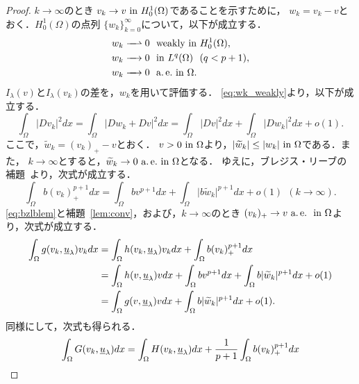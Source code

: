\begin{proof}
 $k \to \infty$のとき
 $v_k \to v ~\tin H_0^1(\Omega)$であることを示すために，
 $w_k = v_k - v$とおく．$H_0^1(\Omega)$の点列
 $\{ w_k \}_{k=0}^\infty$について，以下が成立する．
 \begin{align}
  w_k \xrightharpoonup{ \mbox{ ~ } } 0 & \ \ \text{weakly~} \tin
  H_0^1(\Omega), \label{eq:wk_weakly} \\
  w_k \xrightarrow{ \mbox{ ~ } } 0 & \ \ \tin L^q(\Omega) \ \
  (q < p+1), \label{eq:wk_Lq} \\
  w_k \xrightarrow{ \mbox{ ~ } } 0 & \ \ \ae \tin \Omega. 
  \label{eq:wk_ae}
 \end{align}
 $I_\lambda(v)$と$I_\lambda(v_k)$の差を，$w_k$を用いて評価する．
 \eqref{eq:wk_weakly}より，以下が成立する．
 \begin{equation}
  \int_\Omega \lvert D v_k \rvert^2 dx = \int_\Omega \lvert Dw_k + Dv
   \rvert^2 dx = \int_\Omega \lvert Dv \rvert^2 dx + \int_\Omega \lvert
   Dw_k \rvert^2 dx + o(1). \label{eq:Dvk_Dwk}
 \end{equation}
 ここで，$\tilde{w}_k = (v_k)_+ - v$とおく．
 $v > 0 ~\tin \Omega$より，$\lvert \tilde{w}_k \rvert \leq \lvert w_k
 \rvert ~\tin \Omega$である．また，
 $k \to \infty$とすると，$\tilde{w}_k \to 0 ~\ae \tin \Omega$となる．
 ゆえに，ブレジス・リーブの補題~\cite{MR699419}より，次式が成立する．
 \begin{equation}
  \int_\Omega b(v_k)_{+}^{p+1} dx = \int_\Omega bv^{p+1} dx +
   \int_\Omega \lvert b\tilde{w}_k \rvert^{p+1} dx + o(1) \ \ (k \to
   \infty).
   \label{eq:bzlblem}
 \end{equation}
 \eqref{eq:bzlblem}と補題~\ref{lem:conv}，および，$k \to \infty$のとき
 $(v_k)_+ \to v ~\ae ~\tin \Omega$より，次式が成立する．
 \begin{align}
  \int_\Omega g(v_k, \underline{u}_\lambda) v_k dx &= \int_\Omega
  h(v_k, \underline{u}_\lambda) v_k dx + \int_\Omega b (v_k)_+^{p+1}
  dx \notag \\
  &= \int_\Omega
  h(v, \underline{u}_\lambda) v dx + \int_\Omega b v^{p+1}
  dx + \int_\Omega b \lvert \tilde{w}_k \lvert^{p+1} dx + o(1) \notag \\
  &= \int_\Omega g(v, \underline{u}_\lambda) v dx + 
  \int_\Omega b \lvert \tilde{w}_k \lvert^{p+1} dx + o(1). \label{eq:w_k_1}
 \end{align}
 同様にして，次式も得られる．
 \begin{align}
  \int_\Omega G(v_k, \underline{u}_\lambda) dx &= 
  \int_\Omega H(v_k, \underline{u}_\lambda) dx + \frac{1}{p+1}
  \int_\Omega b (v_k)_+^{p+1} dx \notag \\

\end{align}
\end{proof}
